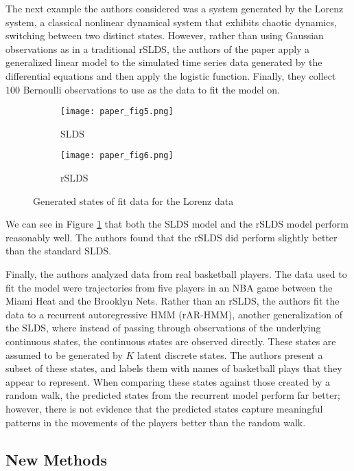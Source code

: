 The next example the authors considered was a system generated by the Lorenz system, a classical nonlinear dynamical system that exhibits chaotic dynamics, switching between two distinct states. However, rather than using Gaussian observations as in a traditional rSLDS, the authors of the paper apply a generalized linear model to the simulated time series data generated by the differential equations and then apply the logistic function. Finally, they collect 100 Bernoulli observations to use as the data to fit the model on.

\begin{figure}[h!]
	\centering
	\begin{subfigure}[b]{0.35\textwidth}
		\texttt{[image: paper\_fig5.png]}
		\caption{SLDS}
	\end{subfigure}
	\begin{subfigure}[b]{0.35\textwidth}
		\texttt{[image: paper\_fig6.png]}
		\caption{rSLDS}
	\end{subfigure}
	\caption{Generated states of fit data for the Lorenz data}
	\label{Lorenzgen}
\end{figure}

We can see in Figure \ref{Lorenzgen} that both the SLDS model and the rSLDS model perform reasonably well. The authors found that the rSLDS did perform slightly better than the standard SLDS.

Finally, the authors analyzed data from real basketball players. The data used to fit the model were trajectories from five players in an NBA game between the Miami Heat and the Brooklyn Nets. Rather than an rSLDS, the authors fit the data to a recurrent autoregressive HMM (rAR-HMM), another generalization of the SLDS, where instead of passing through observations of the underlying continuous states, the continuous states are observed directly. These states are assumed to be generated by $K$ latent discrete states. The authors present a subset of these states, and labels them with names of basketball plays that they appear to represent. When comparing these states against those created by a random walk, the predicted states from the recurrent model perform far better; however, there is not evidence that the predicted states capture meaningful patterns in the movements of the players better than the random walk.

\subsection{New Methods}

